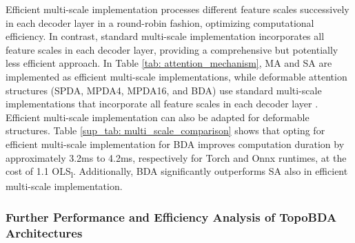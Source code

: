 \begin{table}[t]
\centering
\caption{Analysis of Efficient and Standard Multi-Scale Implementations for BDA. The table compares different attention mechanisms based on the OLS\textsubscript{l} score and processing times in Torch and ONNX runtimes. ONNX* indicates inference without auxiliary mask heads.}
\label{sup_tab: multi_scale_comparison}
\end{table}

Efficient multi-scale implementation processes different feature scales successively in each decoder layer in a round-robin fashion, optimizing computational efficiency. In contrast, standard multi-scale implementation incorporates all feature scales in each decoder layer, providing a comprehensive but potentially less efficient approach. In Table \ref{tab: attention_mechanism}, MA and SA are implemented as efficient multi-scale implementations, while deformable attention structures (SPDA, MPDA4, MPDA16, and BDA) use standard multi-scale implementations that incorporate all feature scales in each decoder layer \cite{zhudeformable, liu2022dabdetr}. Efficient multi-scale implementation can also be adapted for deformable structures. Table \ref{sup_tab: multi_scale_comparison} shows that opting for efficient multi-scale implementation for BDA improves computation duration by approximately 3.2ms to 4.2ms, respectively for Torch and Onnx runtimes, at the cost of 1.1 OLS\textsubscript{l}. Additionally, BDA significantly outperforms SA also in efficient multi-scale implementation.

\subsubsection{Further Performance and Efficiency Analysis of TopoBDA Architectures}
\label{sup_sec: efficiency_analysis}

